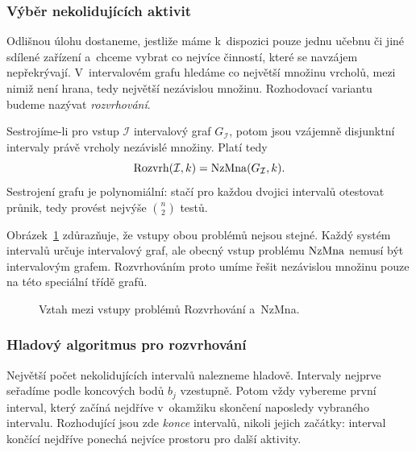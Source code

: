 \subsubsection{Výběr nekolidujících aktivit}

Odlišnou úlohu dostaneme, jestliže máme k~dispozici pouze jednu učebnu či jiné sdílené zařízení a~chceme vybrat co nejvíce činností, které se navzájem nepřekrývají. V~intervalovém grafu hledáme co největší množinu vrcholů, mezi nimiž není hrana, tedy největší nezávislou množinu. Rozhodovací variantu budeme nazývat \emph{rozvrhování}.


Sestrojíme-li pro vstup $\mathcal I$ intervalový graf $G_{\mathcal I}$, potom jsou vzájemně disjunktní intervaly právě vrcholy nezávislé množiny. Platí tedy
\[
    \operatorname{Rozvrh}(\mathcal I,k)=\operatorname{NzMna}(G_{\mathcal I},k).
\]
Sestrojení grafu je polynomiální: stačí pro každou dvojici intervalů otestovat průnik, tedy provést nejvýše $\binom n2$ testů.

Obrázek~\ref{fig:vstupy-rozvrh-nzmna} zdůrazňuje, že vstupy obou problémů nejsou stejné. Každý systém intervalů určuje intervalový graf, ale obecný vstup problému \ensuremath{\NZMNA} nemusí být intervalovým grafem. Rozvrhováním proto umíme řešit nezávislou množinu pouze na této speciální třídě grafů.
\begin{figure}[ht]
    \centering
    
    \caption{Vztah mezi vstupy problémů Rozvrhování a~NzMna.}
    \label{fig:vstupy-rozvrh-nzmna}
\end{figure}

\subsubsection{Hladový algoritmus pro rozvrhování}

Největší počet nekolidujících intervalů nalezneme hladově. Intervaly nejprve seřadíme podle koncových bodů $b_j$ vzestupně. Potom vždy vybereme první interval, který začíná nejdříve v~okamžiku skončení naposledy vybraného intervalu. Rozhodující jsou zde \emph{konce} intervalů, nikoli jejich začátky: interval končící nejdříve ponechá nejvíce prostoru pro další aktivity.

